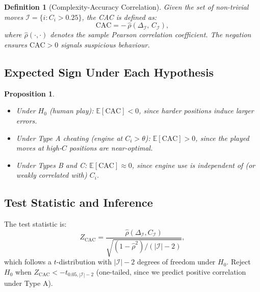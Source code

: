 \documentclass[11pt,a4paper]{article}
\newtheorem{definition}{Definition}
\newtheorem{proposition}{Proposition}
\newcommand{\CAC}{\mathrm{CAC}}
\begin{document}
\begin{definition}[Complexity-Accuracy Correlation]
Given the set of non-trivial moves $\mathcal{I} = \{i : C_i > 0.25\}$,
the CAC is defined as:
\begin{equation}
  \CAC = -\,\hat{\rho}(\Delta_{\mathcal{I}},\, C_{\mathcal{I}}),
  \label{eq:cac}
\end{equation}
where $\hat{\rho}(\cdot, \cdot)$ denotes the sample Pearson correlation
coefficient. The negation ensures $\CAC > 0$ signals suspicious behaviour.
\end{definition}

\subsection{Expected Sign Under Each Hypothesis}

\begin{proposition}
\label{prop:cac_sign}
\begin{itemize}
  \item Under $H_0$ (human play): $\mathbb{E}[\CAC] < 0$, since harder
    positions induce larger errors.
  \item Under Type A cheating (engine at $C_i > \theta$):
    $\mathbb{E}[\CAC] > 0$, since the played moves at high-$C$ positions
    are near-optimal.
  \item Under Types B and C: $\mathbb{E}[\CAC] \approx 0$, since engine
    use is independent of (or weakly correlated with) $C_i$.
\end{itemize}
\end{proposition}

\subsection{Test Statistic and Inference}

The test statistic is:
\begin{equation}
  Z_{\mathrm{CAC}} = \frac{\hat{\rho}(\Delta_{\mathcal{I}}, C_{\mathcal{I}})}
  {\sqrt{(1 - \hat{\rho}^2)/(|\mathcal{I}| - 2)}},
  \label{eq:cac_test}
\end{equation}
which follows a $t$-distribution with $|\mathcal{I}| - 2$ degrees of freedom
under $H_0$. Reject $H_0$ when $Z_{\mathrm{CAC}} < -t_{0.05, |\mathcal{I}|-2}$
(one-tailed, since we predict positive correlation under Type A).
\end{document}
